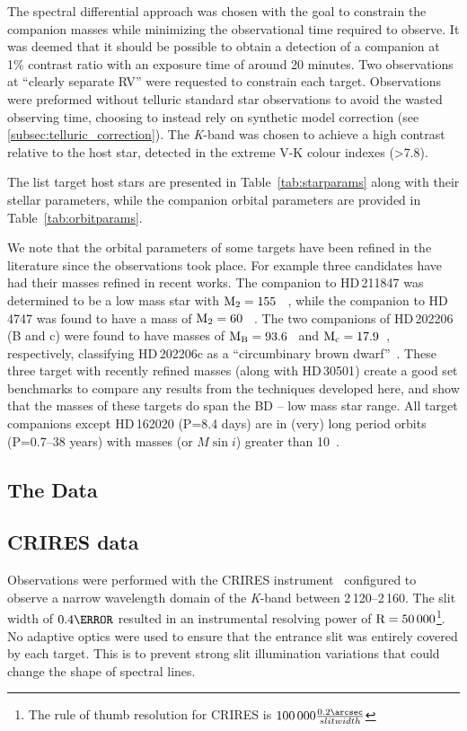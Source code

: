 The spectral differential approach was chosen with the goal to constrain the companion masses while minimizing the observational time required to observe. It was deemed that it should be possible to obtain a detection of a companion at 1\% contrast ratio with an exposure time of around 20 minutes. Two observations at ``clearly separate RV'' were requested to constrain each target. Observations were preformed without telluric standard star observations to avoid the wasted observing time, choosing to instead rely on synthetic model correction (see \ref{subsec:telluric_correction}). The \textit{K}-band was chosen to achieve a high contrast relative to the host star, detected in the extreme V-K colour indexes (>7.8). 

The list target host stars are presented in Table~\ref{tab:starparams} along with their stellar parameters, while the companion orbital parameters are provided in Table~\ref{tab:orbitparams}.

We note that the orbital parameters of some targets have been refined in the literature since the observations took place. For example three candidates have had their masses refined in recent works. The companion to {HD\,211847} was determined to be a low mass star with \(\rm M_2=155~\)\Mjup{}~\citep{moutou_eccentricity_2017}, while the companion to {HD\,4747} was found to have a mass of \(\rm M_2=60~\)\Mjup{}~\citep{crepp_trends_2016}. The two companions of {HD\,202206} (B and c) were found to have masses of \(\rm M_B =93.6\)~\Mjup{} and \(\rm M_c = 17.9\)~\Mjup{}, respectively, classifying {HD\,202206}c as a ``circumbinary brown dwarf''~\citep{benedict_hd_2017}. These three target with recently refined masses (along with {HD\,30501}) create a good set benchmarks to compare any results from the techniques developed here, and show that the masses of these targets do span the BD -- low mass star range. All target companions except {HD\,162020} (P=8.4 days) are in (very) long period orbits (P=0.7--38 years) with masses (or \(M\sin{i}\)) greater than 10~\Mjup{}.




\subsection{The Data}

\subsection{CRIRES data}
\label{subsec:CRIRES}
Observations were performed with the {CRIRES} instrument~\citep{kaeufl_crires_2004} configured to observe a narrow wavelength domain of the \emph{K}-band between 2\,120--2\,160\nm{}. The slit width of \(0.4\arcsecond\) resulted in an instrumental resolving power of \(\rm R=50\,000\)\footnote{The rule of thumb resolution for {CRIRES} is \(100\,000\frac{0.2\arcsec}{slit width}\)}. No adaptive optics were used to ensure that the entrance slit was entirely covered by each target. This is to prevent strong slit illumination variations that could change the shape of spectral lines.

